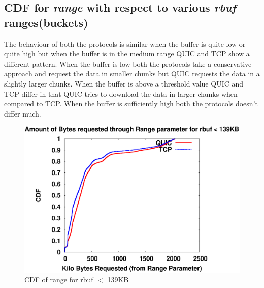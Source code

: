 \subsection{CDF for \textit{range} with respect to various \textit{rbuf} ranges(buckets) }
The behaviour of both the protocols is similar when the buffer is quite low or quite high but when the buffer is in the medium range QUIC and TCP show a different pattern. When the buffer is low both the protocols take a conservative approach and request the data in smaller chunks but QUIC requests the data in a slightly larger chunks. When the buffer is above a threshold value QUIC and TCP differ in that QUIC tries to download the data in larger chunks when compared to TCP. When the buffer is sufficiently high both the protocols doesn't differ much.
\begin{figure}[!ht]
    \centering
    \includegraphics[width=0.9\linewidth]{img/CDF/plot_range_142367}
    \caption{CDF of range for rbuf $<$ 139KB}
    \label{fig:rabuf6556}
\end{figure}

